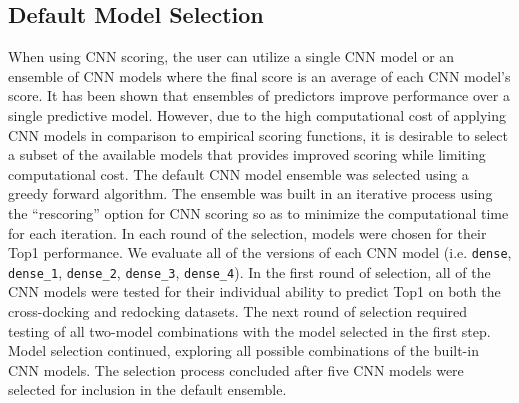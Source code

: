 \documentclass[linenumbers,doublespacing]{bmcart}
\begin{document}
\subsection{Default Model Selection}
When using CNN scoring, the user can utilize a single CNN model or an ensemble of CNN models where the final score is an average of each CNN model's score. It has been shown that ensembles of predictors improve performance over a single predictive model\cite{dietterich2000ensemble}. However, due to the high computational cost of applying CNN models in comparison to empirical scoring functions, it is desirable to select a subset of the available models that provides improved scoring while limiting computational cost. The default CNN model ensemble was selected using a greedy forward algorithm. The ensemble was built in an iterative process using the ``rescoring'' option for CNN scoring so as to minimize the computational time for each iteration. In each round of the selection, models were chosen for their Top1 performance. We evaluate all of the versions of each CNN model (i.e. \texttt{dense}, \texttt{dense\_1}, \texttt{dense\_2}, \texttt{dense\_3}, \texttt{dense\_4}). In the first round of selection, all of the CNN models were tested for their individual ability to predict Top1 on both the cross-docking and redocking datasets. The next round of selection required testing of all two-model combinations with the model selected in the first step. Model selection continued, exploring all possible combinations of the built-in CNN models. The selection process concluded after five CNN models were selected for inclusion in the default ensemble.
\end{document}
